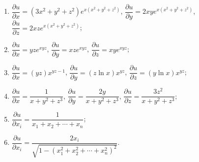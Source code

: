 \documentclass[a4paper, 11pt]{ctexart}
\begin{document}
\begin{enumerate}
\begin{enumerate}[(1)]
            \item %
                $\dfrac{\partial{u}}{\partial{x}} = (3x^2+y^2+z^2)e^{x(x^2+y^2+z^2)}$,
                $\dfrac{\partial{u}}{\partial{y}} = 2xye^{x(x^2+y^2+z^2)}$,
                $\dfrac{\partial{u}}{\partial{z}} = 2xze^{x(x^2+y^2+z^2)}$;
            \item %
                $\dfrac{\partial{u}}{\partial{x}}=yze^{xyz}$,
                $\dfrac{\partial{u}}{\partial{y}}=xze^{xyz}$,
                $\dfrac{\partial{u}}{\partial{z}}=xye^{xyz}$;
            \item %
                $\dfrac{\partial{u}}{\partial{x}} = (yz)x^{yz-1}$,
                $\dfrac{\partial{u}}{\partial{y}} = (z\ln{x})x^{yz}$,
                $\dfrac{\partial{u}}{\partial{z}} = (y\ln{x})x^{yz}$;
            \item %
                $\dfrac{\partial{u}}{\partial{x}} = \dfrac{1}{x+y^2+z^3}$,
                $\dfrac{\partial{u}}{\partial{y}} = \dfrac{2y}{x+y^2+z^3}$,
                $\dfrac{\partial{u}}{\partial{z}} = \dfrac{3z^2}{x+y^2+z^3}$;
            \item %
                $\dfrac{\partial{u}}{\partial{x_i}} = \dfrac{1}{x_1 + x_2 + \cdots + x_n}$;
            \item %
                $\dfrac{\partial{u}}{\partial{x_i}} = \dfrac{2x_i}{\sqrt{1 - (x_1^2 + x_2^2 + \cdots + x_n^2)^2}}$.
        \end{enumerate}
\end{enumerate}
\end{document}
